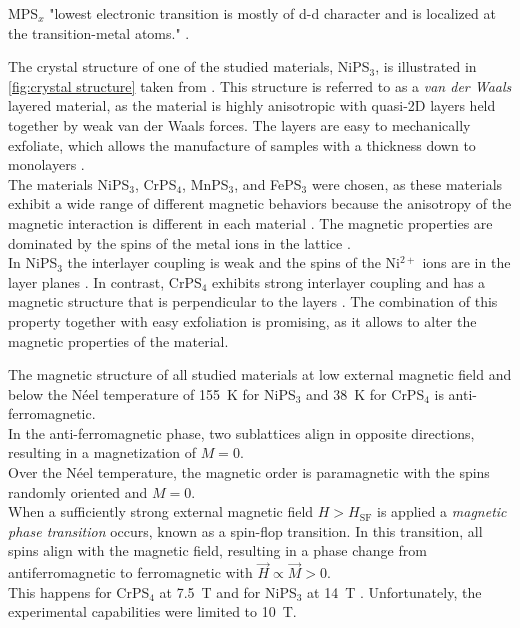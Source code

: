\documentclass[
	oneside,
	parskip=half,
	a4paper,
]{scrbook}
\begin{document}
MPS$_x$ "lowest electronic transition is mostly of d-d character and is localized at the transition-metal atoms." \cite{CrPS4_pl}.

The crystal structure of one of the studied materials, NiPS$_3$, is illustrated in \autoref{fig:crystal structure} taken from \cite{NiPS3_coherent}.
This structure is referred to as a \textit{van der Waals} layered material, as the material is highly anisotropic with quasi-2D layers held together by weak van der Waals forces.
The layers are easy to mechanically exfoliate, which allows the manufacture of samples with a thickness down to monolayers \cite{NiPS3_few_layer}.\\
The materials NiPS$_3$, CrPS$_4$, MnPS$_3$, and FePS$_3$ were chosen,  
as these materials exhibit a wide range of different magnetic behaviors because the anisotropy of the magnetic interaction is different in each material \cite{MPS_magnetism,CrPS4_magnetic}.
The magnetic properties are dominated by the spins of the metal ions in the lattice \cite{MPS_magnetism, NiPS3_magnon_gap, CrPS4_magnetic}.\\
In NiPS$_3$ the interlayer coupling is weak and the spins of the Ni$^{2+}$ ions are in the layer planes \cite{MPS_magnetism}.
In contrast, CrPS$_4$ exhibits strong interlayer coupling and has a magnetic structure that is perpendicular to the layers \cite{CrPS4_magnetic}.
The combination of this property together with easy exfoliation is promising, as it allows to alter the magnetic properties of the material.

The magnetic structure of all studied materials at low external magnetic field and below the Néel temperature of \SI{155}{K} for NiPS$_3$ and \SI{38}{K} for CrPS$_4$ \cite{MPS_magnetism, CrPS4_magnetic}  is anti-ferromagnetic.\\
In the anti-ferromagnetic phase, two sublattices align in opposite directions, resulting in a magnetization of $M=0$.\\
Over the Néel temperature, the magnetic order is paramagnetic with the spins randomly oriented and $M=0$.\\
When a sufficiently strong external magnetic field $H>H_\text{SF}$ is applied a \textit{magnetic phase transition} occurs, known as a spin-flop transition.
In this transition, all spins align with the magnetic field, resulting in a phase change from antiferromagnetic to ferromagnetic with $\vec{H}\propto \vec{M}>0$.\\
This happens for CrPS$_4$ at \SI{7.5}{T} \cite{CrPS4_magnetic} and for NiPS$_3$ at \SI{14}{T} \cite{NiPS3_magnon_gap}.
Unfortunately, the experimental capabilities were limited to \SI{10}{T}.
\end{document}
